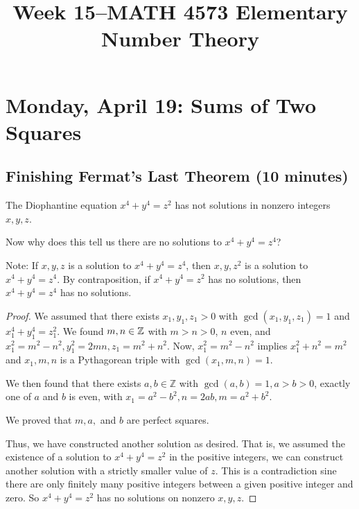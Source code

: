 \documentclass[letterpaper, 11 pt]{article}
\title{Week 15--MATH 4573 Elementary Number Theory}
\begin{document}
\maketitle
\tableofcontents
\section{Monday, April 19: Sums of Two Squares}

\subsection{Finishing Fermat's Last Theorem (10 minutes)}
\begin{thm}
 The Diophantine equation $x^4+y^4=z^2$ has not solutions in nonzero integers $x,y,z$.
\end{thm}
\begin{cb}
 Now why does this tell us there are no solutions to $x^4+y^4=z^4$?
\end{cb}
Note: If $x,y,z$ is a solution to $x^4+y^4=z^4$, then {$x,y,z^2$} is a solution to $x^4+y^4=z^4$. By contraposition, if $x^4+y^4=z^2$ has no solutions, then $x^4+y^4=z^4$ has no solutions. 

\begin{proof}
We assumed that there exists $x_1,y_1,z_1>0$ with $\gcd(x_1,y_1,z_1)=1$ and $x_1^4+y_1^4=z_1^2$. We found $m,n\in \mathbb Z$ with $m>n>0$, $n$ even, and  $x_1^2=m^2-n^2, y_1^2=2mn, z_1=m^2+n^2$. Now, $x_1^2=m^2-n^2$ implies $x_1^2+n^2=m^2$ and $x_1,m,n$ is a Pythagorean triple with $\gcd(x_1,m,n)=1$. 

We then found that there exists $a,b\in\mathbb{Z}$ with $\gcd(a,b)=1,a>b>0$, exactly one of $a$ and $b$ is even, with $x_1=a^2-b^2, n=2ab, m=a^2+b^2$. 

We proved that $m,a,$ and $b$ are perfect squares.

Thus, we have constructed another solution as desired. That is, we assumed the existence of a solution to $x^4+y^4=z^2$ in the positive integers, we can construct another solution with a strictly smaller value of $z$. This is a contradiction sine there are only finitely many positive integers between a given positive integer and zero. So $x^4+y^4=z^2$ has no solutions on nonzero $x,y,z$.
\end{proof}
\end{document}

